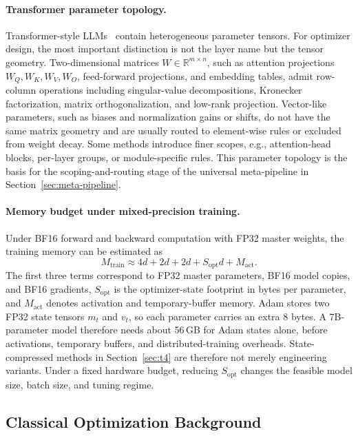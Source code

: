 \paragraph{Transformer parameter topology.}
Transformer-style LLMs~\cite{vaswani2017attention} contain heterogeneous
parameter tensors.  For optimizer design, the most important distinction is not
the layer name but the tensor geometry.  Two-dimensional matrices
$W\in\mathbb{R}^{m\times n}$, such as attention projections
$W_Q,W_K,W_V,W_O$, feed-forward projections, and embedding tables, admit
row-column operations including singular-value decompositions, Kronecker
factorization, matrix orthogonalization, and low-rank projection.  Vector-like
parameters, such as biases and normalization gains or shifts, do not have the
same matrix geometry and are usually routed to element-wise rules or excluded
from weight decay.  Some methods introduce finer scopes, e.g., attention-head
blocks, per-layer groups, or module-specific rules.  This parameter topology is
the basis for the scoping-and-routing stage of the universal meta-pipeline in
Section~\ref{sec:meta-pipeline}.

\paragraph{Memory budget under mixed-precision training.}
Under BF16 forward and backward computation with FP32 master weights, the
training memory can be estimated as
\begin{equation}
  M_{\mathrm{train}}
  \approx 4d + 2d + 2d + S_{\mathrm{opt}}d + M_{\mathrm{act}}.
  \label{eq:memory-budget}
\end{equation}
The first three terms correspond to FP32 master parameters, BF16 model copies,
and BF16 gradients, $S_{\mathrm{opt}}$ is the optimizer-state footprint in bytes
per parameter, and $M_{\mathrm{act}}$ denotes activation and temporary-buffer
memory.  Adam stores two FP32 state tensors $m_t$ and $v_t$, so each parameter
carries an extra 8 bytes.  A 7B-parameter model therefore needs about 56\,GB for
Adam states alone, before activations, temporary buffers, and distributed-training
overheads.  State-compressed methods in Section~\ref{sec:t4} are therefore not
merely engineering variants.  Under a fixed hardware budget, reducing
$S_{\mathrm{opt}}$ changes the feasible model size, batch size, and tuning regime.

\subsection{Classical Optimization Background}
\label{sec:prelim-background}

